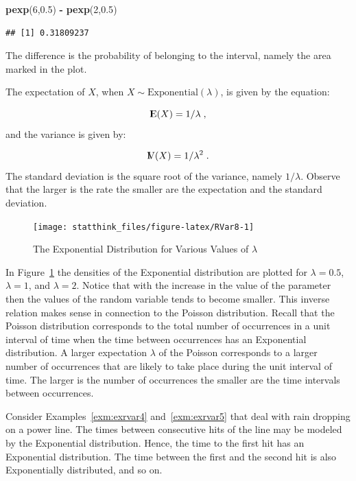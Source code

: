 \documentclass[]{krantz}
\makeatletter
\newenvironment{Shaded}{\begin{snugshade}}{\end{snugshade}}
\newcommand{\KeywordTok}[1]{\textcolor[rgb]{0.13,0.29,0.53}{\textbf{#1}}}
\newcommand{\DecValTok}[1]{\textcolor[rgb]{0.00,0.00,0.81}{#1}}
\newcommand{\FloatTok}[1]{\textcolor[rgb]{0.00,0.00,0.81}{#1}}
\newcommand{\StringTok}[1]{\textcolor[rgb]{0.31,0.60,0.02}{#1}}
\newcommand{\OperatorTok}[1]{\textcolor[rgb]{0.81,0.36,0.00}{\textbf{#1}}}
\newcommand{\NormalTok}[1]{#1}
\newcommand{\Expec}{{\rm I\kern-.3em E}}
\newcommand{\Var}{{\rm I\kern-.3em V}}
\newenvironment{kframe}{%
\medskip{}
\setlength{\fboxsep}{.8em}
 \def\at@end@of@kframe{}%
 \ifinner\ifhmode%
  \def\at@end@of@kframe{\end{minipage}}%
  \begin{minipage}{\columnwidth}%
 \fi\fi%
 \def\FrameCommand##1{\hskip\@totalleftmargin \hskip-\fboxsep
 \colorbox{shadecolor}{##1}\hskip-\fboxsep
     \hskip-\linewidth \hskip-\@totalleftmargin \hskip\columnwidth}%
 \MakeFramed {\advance\hsize-\width
   \@totalleftmargin\z@ \linewidth\hsize
   \@setminipage}}%
 {\par\unskip\endMakeFramed%
 \at@end@of@kframe}
\renewenvironment{Shaded}{\begin{kframe}}{\end{kframe}}
\theoremstyle{definition}
\theoremstyle{definition}
\theoremstyle{definition}
\theoremstyle{remark}
\let\BeginKnitrBlock\begin \let\EndKnitrBlock\end
\makeatother
\begin{document}
\begin{Shaded}
\begin{Highlighting}[]
\KeywordTok{pexp}\NormalTok{(}\DecValTok{6}\NormalTok{,}\FloatTok{0.5}\NormalTok{) }\OperatorTok{-}\StringTok{ }\KeywordTok{pexp}\NormalTok{(}\DecValTok{2}\NormalTok{,}\FloatTok{0.5}\NormalTok{)}
\end{Highlighting}
\end{Shaded}

\begin{verbatim}
## [1] 0.31809237
\end{verbatim}

The difference is the probability of belonging to the interval, namely
the area marked in the plot.

The expectation of \(X\), when \(X \sim \mathrm{Exponential}(\lambda)\),
is given by the equation:

\[\Expec(X) = 1/\lambda\;,\] and the variance is given by:

\[\Var(X) =1/\lambda^2\;.\] The standard deviation is the square root of
the variance, namely \(1/\lambda\). Observe that the larger is the rate
the smaller are the expectation and the standard deviation.

\begin{figure}

{\centering \texttt{[image: statthink\_files/figure-latex/RVar8-1]} 

}

\caption{The Exponential Distribution for Various Values of $\lambda$}\label{fig:RVar8}
\end{figure}

In Figure~\ref{fig:RVar8} the densities of the Exponential distribution
are plotted for \(\lambda = 0.5\), \(\lambda = 1\), and \(\lambda = 2\).
Notice that with the increase in the value of the parameter then the
values of the random variable tends to become smaller. This inverse
relation makes sense in connection to the Poisson distribution. Recall
that the Poisson distribution corresponds to the total number of
occurrences in a unit interval of time when the time between occurrences
has an Exponential distribution. A larger expectation \(\lambda\) of the
Poisson corresponds to a larger number of occurrences that are likely to
take place during the unit interval of time. The larger is the number of
occurrences the smaller are the time intervals between occurrences.

\BeginKnitrBlock{example}
\protect\hypertarget{exm:exrvar7}{}{\label{exm:exrvar7} }Consider
Examples~\ref{exm:exrvar4} and~\ref{exm:exrvar5} that deal with rain
dropping on a power line. The times between consecutive hits of the line
may be modeled by the Exponential distribution. Hence, the time to the
first hit has an Exponential distribution. The time between the first
and the second hit is also Exponentially distributed, and so on.
\EndKnitrBlock{example}
\end{document}
